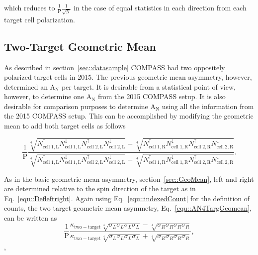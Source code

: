 \noindent
which reduces to $\frac{1}{\mathrm{P}}\frac{1}{\sqrt{\mathrm{N}}}$ in the case
of equal statistics in each direction from each target cell polarization.

\subsection{Two-Target Geometric Mean} \label{sec::TwoTargGeoMean}
As described in section~\ref{sec::datasample} COMPASS had two oppositely
polarized target cells in 2015.  The previous geometric mean asymmetry, however,
determined an A$_{\mathrm{N}}$ per target.  It is desirable from a statistical
point of view, however, to determine one A$_{\mathrm{N}}$ from the 2015 COMPASS
setup.  It is also desirable for comparison purposes to determine
A$_{\mathrm{N}}$ using all the information from the 2015 COMPASS setup.  This
can be accomplished by modifying the geometric mean to add both target cells as
follows

\begin{equation}
  \label{equ::AN4TargGeomean}
  \frac{1}{\mathrm{P}}
  \frac{
    \sqrt[4]{
      N_{\mathrm{cell\;1,L}}^{\uparrow}N_{\mathrm{cell\;1, L}}^{\downarrow}
      N_{\mathrm{cell\;2,L}}^{\uparrow}N_{\mathrm{cell\;2, L}}^{\downarrow}
    } -
    \sqrt[4]{
      N_{\mathrm{cell\;1,R}}^{\uparrow}N_{\mathrm{cell\;1, R}}^{\downarrow}
      N_{\mathrm{cell\;2,R}}^{\uparrow}N_{\mathrm{cell\;2, R}}^{\downarrow}
    }
  }{
    \sqrt[4]{
      N_{\mathrm{cell\;1,L}}^{\uparrow}N_{\mathrm{cell\;1, L}}^{\downarrow}
      N_{\mathrm{cell\;2,L}}^{\uparrow}N_{\mathrm{cell\;2, L}}^{\downarrow}
    } +
    \sqrt[4]{
      N_{\mathrm{cell\;1,R}}^{\uparrow}N_{\mathrm{cell\;1, R}}^{\downarrow}
      N_{\mathrm{cell\;2,R}}^{\uparrow}N_{\mathrm{cell\;2, R}}^{\downarrow}
    }
  }.
\end{equation}

As in the basic geometric mean asymmetry, section~\ref{sec::GeoMean}, left and
right are determined relative to the spin direction of the target as in
Eq.~\ref{equ::Defleftright}.  Again using Eq.~\ref{equ::indexedCount} for the
definition of counts, the two target geometric mean asymmetry,
Eq.~\ref{equ::AN4TargGeomean}, can be written as
\begin{equation}
  \frac{1}{\mathrm{P}}
  \frac{
    \kappa_{\mathrm{two-target}} \sqrt[4]{\sigma_{L}\sigma_{L}\sigma_{L}\sigma_{L}} -
    \sqrt[4]{\sigma_{R}\sigma_{R}\sigma_{R}\sigma_{R}}
  }{
    \kappa_{\mathrm{two-target}} \sqrt[4]{\sigma_{L}\sigma_{L}\sigma_{L}\sigma_{L}} +
    \sqrt[4]{\sigma_{R}\sigma_{R}\sigma_{R}\sigma_{R}}
  },
\end{equation},

